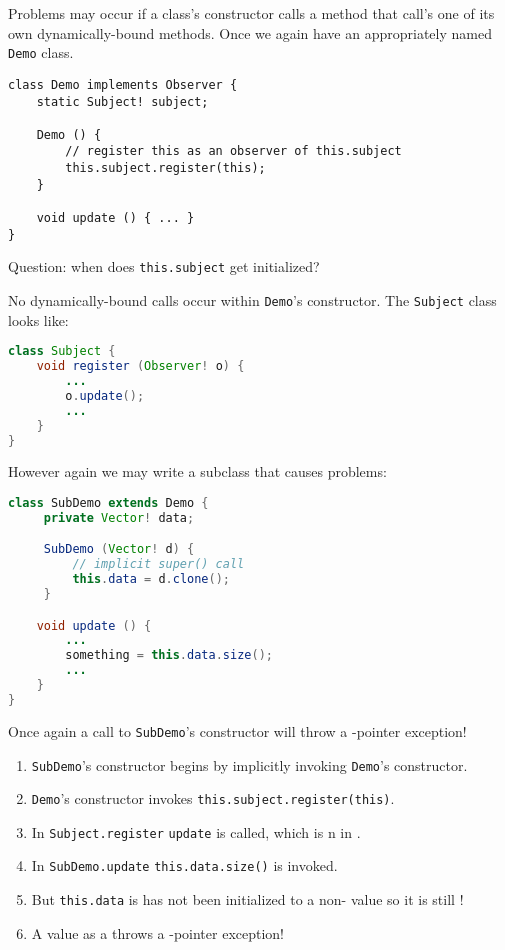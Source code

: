 \documentclass{article}
\begin{document}
\begin{example}
  Problems may occur if a class's constructor calls a method that call's one of its own dynamically-bound methods.
  Once we again have an appropriately named \texttt{Demo} class.
\begin{lstlisting}
class Demo implements Observer {
    static Subject! subject;

    Demo () {
        // register this as an observer of this.subject
        this.subject.register(this);
    }

    void update () { ... }
}
\end{lstlisting}
  Question: when does \texttt{this.subject} get initialized?

  No dynamically-bound calls occur within \texttt{Demo}'s constructor.
  The \texttt{Subject} class looks like:
\begin{lstlisting}[language=Java]
class Subject {
    void register (Observer! o) {
        ...
        o.update();
        ...
    }
}
\end{lstlisting}
  However again we may write a subclass that causes problems:
\begin{lstlisting}[language=Java]
class SubDemo extends Demo {
     private Vector! data;

     SubDemo (Vector! d) {
         // implicit super() call
         this.data = d.clone();
     }

    void update () {
        ...
        something = this.data.size();
        ...
    }
}
\end{lstlisting}
  Once again a call to \texttt{SubDemo}'s constructor will throw a \cringe{}-pointer exception!
  \begin{enumerate}
  \item \texttt{SubDemo}'s constructor begins by implicitly invoking \texttt{Demo}'s constructor.
  \item \texttt{Demo}'s constructor invokes \texttt{this.subject.register(this)}.
  \item In \texttt{Subject.register} \texttt{update} is called, which is \override{}n in .
  \item In \texttt{SubDemo.update} \texttt{this.data.size()} is invoked.
  \item But \texttt{this.data} is has not been initialized to a non-\cringe{} value so it is still \cringe{}!
  \item A \cringe{} value as a \receiver{} throws a \cringe{}-pointer exception!
  \end{enumerate}
\end{example}
\end{document}
